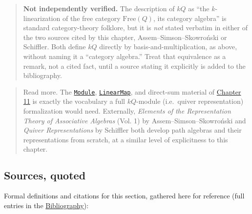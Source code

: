 \begin{quote}
\textbf{Not independently verified.} The description of \(kQ\) as ``the \(k\)-linearization of the free category \(\mathrm{Free}(Q)\), its category algebra'' is standard category-theory folklore, but it is \emph{not} stated verbatim in either of the two sources cited by this chapter, Assem--Simson--Skowroński or Schiffler. Both define \(kQ\) directly by basis-and-multiplication, as above, without naming it a ``category algebra.'' Treat that equivalence as a remark, not a cited fact, until a source stating it explicitly is added to the bibliography.
\end{quote}

\begin{quote}
Read more. The \href{https://loogle.lean-lang.org/?q=Module}{\texttt{Module}}, \href{https://loogle.lean-lang.org/?q=LinearMap}{\texttt{LinearMap}}, and direct-sum material of \hyperref[sec:11-modules:00-index:1]{Chapter 11} is exactly the vocabulary a full \(kQ\)-module (i.e.~quiver representation) formalization would need. Externally, \emph{Elements of the Representation Theory of Associative Algebras} (Vol. 1) by Assem--Simson--Skowroński and \emph{Quiver Representations} by Schiffler both develop path algebras and their representations from scratch, at a similar level of explicitness to this chapter.
\end{quote}

\subsection{Sources, quoted}\label{sec:12-path-algebras:05-path-composition:4}

Formal definitions and citations for this section, gathered here for reference (full entries in the \hyperref[sec:root:bibliography:1]{Bibliography}):

